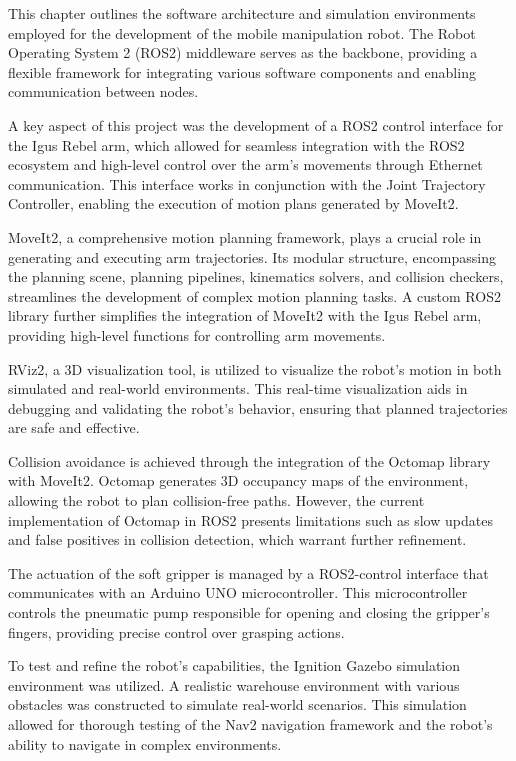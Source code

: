 This chapter outlines the software architecture and simulation environments employed for the development of the mobile
manipulation robot. The Robot Operating System 2 (ROS2) middleware serves as the backbone, providing a flexible framework
for integrating various software components and enabling communication between nodes.

A key aspect of this project was the development of a ROS2 control interface for the Igus Rebel arm, which allowed for 
seamless integration with the ROS2 ecosystem and high-level control over the arm's movements through Ethernet communication.
This interface works in conjunction with the Joint Trajectory Controller, enabling the execution of motion plans 
generated by MoveIt2.

MoveIt2, a comprehensive motion planning framework, plays a crucial role in generating and executing arm trajectories.
Its modular structure, encompassing the planning scene, planning pipelines, kinematics solvers, and collision checkers,
streamlines the development of complex motion planning tasks. A custom ROS2 library further simplifies the 
integration of MoveIt2 with the Igus Rebel arm, providing high-level functions for controlling arm movements.

RViz2, a 3D visualization tool, is utilized to visualize the robot's motion in both simulated and real-world environments.
This real-time visualization aids in debugging and validating the robot's behavior, ensuring that planned trajectories
are safe and effective.

Collision avoidance is achieved through the integration of the Octomap library with MoveIt2. Octomap generates 3D 
occupancy maps of the environment, allowing the robot to plan collision-free paths. However, the current implementation
of Octomap in ROS2 presents limitations such as slow updates and false positives in collision detection, which warrant 
further refinement.

The actuation of the soft gripper is managed by a ROS2-control interface that communicates with an Arduino UNO microcontroller. 
This microcontroller controls the pneumatic pump responsible for opening and closing the gripper's fingers, 
providing precise control over grasping actions.

To test and refine the robot's capabilities, the Ignition Gazebo simulation environment was utilized. 
A realistic warehouse environment with various obstacles was constructed to simulate real-world scenarios.
This simulation allowed for thorough testing of the Nav2 navigation framework and the robot's ability to navigate 
in complex environments.

